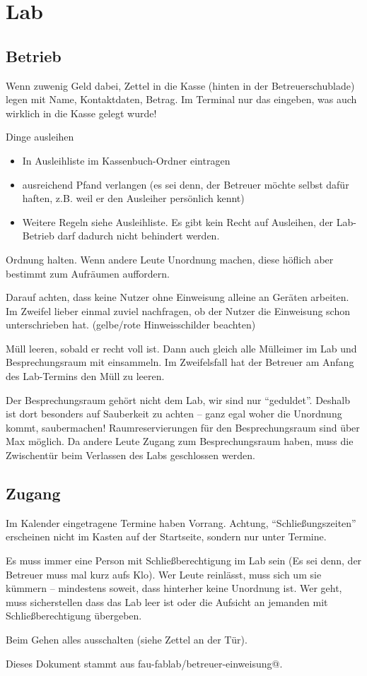 \documentclass{\basedir/fablab-document}
\begin{document}
\section{Lab}
\subsection{Betrieb}
Wenn zuwenig Geld dabei, Zettel in die Kasse (hinten in der Betreuerschublade) legen mit Name, Kontaktdaten, Betrag.
Im Terminal nur das eingeben, was auch wirklich in die Kasse gelegt wurde!

Dinge ausleihen
\begin{itemize}
 \item In Ausleihliste im Kassenbuch-Ordner eintragen
 \item ausreichend Pfand verlangen (es sei denn, der Betreuer möchte selbst dafür haften, z.B. weil er den Ausleiher persönlich kennt)
 \item Weitere Regeln siehe Ausleihliste. Es gibt kein Recht auf Ausleihen, der Lab-Betrieb darf dadurch nicht behindert werden.
\end{itemize}

Ordnung halten. Wenn andere Leute Unordnung machen, diese höflich aber bestimmt zum Aufräumen auffordern.

Darauf achten, dass keine Nutzer ohne Einweisung alleine an Geräten arbeiten. Im Zweifel lieber einmal zuviel nachfragen, ob der Nutzer die Einweisung schon unterschrieben hat. (gelbe/rote Hinweisschilder beachten)

Müll leeren, sobald er recht voll ist. Dann auch gleich alle Mülleimer im Lab und Besprechungsraum mit einsammeln. Im Zweifelsfall hat der Betreuer am Anfang des Lab-Termins den Müll zu leeren.

Der Besprechungsraum gehört nicht dem Lab, wir sind nur \enquote{geduldet}. Deshalb ist dort besonders auf Sauberkeit zu achten -- ganz egal woher die Unordnung kommt, saubermachen!
Raumreservierungen für den Besprechungsraum sind über Max möglich. Da andere Leute Zugang zum Besprechungsraum haben, muss die Zwischentür beim Verlassen des Labs geschlossen werden.

\subsection{Zugang}
Im Kalender eingetragene Termine haben Vorrang. Achtung, \enquote{Schließungszeiten} erscheinen nicht im Kasten auf der Startseite, sondern nur unter Termine.

Es muss immer eine Person mit Schließberechtigung im Lab sein (Es sei denn, der Betreuer muss mal kurz aufs Klo). Wer Leute reinlässt, muss sich um sie kümmern -- mindestens soweit, dass hinterher keine Unordnung ist. Wer geht, muss sicherstellen dass das Lab leer ist oder die Aufsicht an jemanden mit Schließberechtigung übergeben.

Beim Gehen alles ausschalten (siehe Zettel an der Tür).



Dieses Dokument stammt aus fau-fablab/betreuer-einweisung@\Revision{}.
\end{document}
